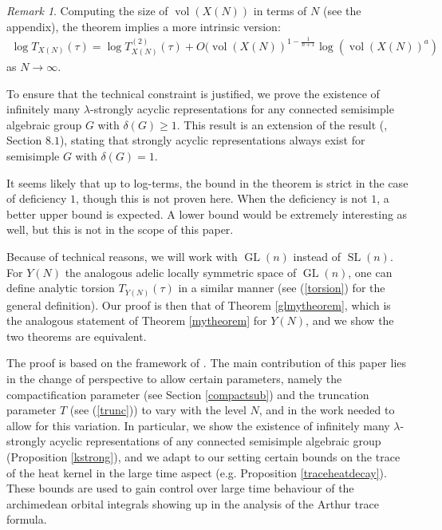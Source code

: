 \documentclass[11pt,reqno]{amsart}
\numberwithin{equation}{section}
\theoremstyle{definition}
\theoremstyle{remark}
\newtheorem{rmk}[thm]{Remark}
\newcommand{\GL}{\operatorname{GL}}
\newcommand{\SL}{\operatorname{SL}}
\newcommand{\vol}{\operatorname{vol}}
\begin{document}
\begin{rmk}\label{mytheoreminvar}
    Computing the size of $\vol(X(N))$ in terms of $N$ (see the appendix), the theorem implies a more intrinsic version:
\begin{align}
    \log T_{X(N)}(\tau) = \log T_{X(N)}^{(2)}(\tau)+O(\vol(X(N))^{1-\frac{1}{n+1}}\log(\vol(X(N))^a)
\end{align}
\noindent as $N\to\infty$.
\end{rmk}

\noindent To ensure that the technical constraint is justified, we prove the existence of infinitely many $\lambda$-strongly acyclic representations for any connected semisimple algebraic group $G$ with $\delta(G)\geq 1$. This result is an extension of the result (\cite{BV}, Section $8.1$), stating that strongly acyclic representations always exist for semisimple $G$ with $\delta(G)=1$.

It seems likely that up to log-terms, the bound in the theorem is strict in the case of deficiency $1$, though this is not proven here. When the deficiency is not $1$, a better upper bound is expected. A lower bound would be extremely interesting as well, but this is not in the scope of this paper.

Because of technical reasons, we will work with $\GL(n)$ instead of $\SL(n)$. For $Y(N)$ the analogous adelic locally symmetric space of $\GL(n)$, one can define analytic torsion $T_{Y(N)}(\tau)$ in a similar manner (see (\ref{torsion}) for the general definition). Our proof is then that of Theorem \ref{glmytheorem}, which is the analogous statement of Theorem \ref{mytheorem} for $Y(N)$, and we show the two theorems are equivalent.

The proof is based on the framework of \cite{MzM2}. The main contribution of this paper lies in the change of perspective to allow certain parameters, namely the compactification parameter (see Section \ref{compactsub}) and the truncation parameter $T$ (see (\ref{trunc})) to vary with the level $N$, and in the work needed to allow for this variation. In particular, we show the existence of infinitely many $\lambda$-strongly acyclic representations of any connected semisimple algebraic group (Proposition \ref{kstrong}), and we adapt to our setting certain bounds on the trace of the heat kernel in the large time aspect (e.g. Proposition \ref{traceheatdecay}). These bounds are used to gain control over large time behaviour of the archimedean orbital integrals showing up in the analysis of the Arthur trace formula.
\end{document}
